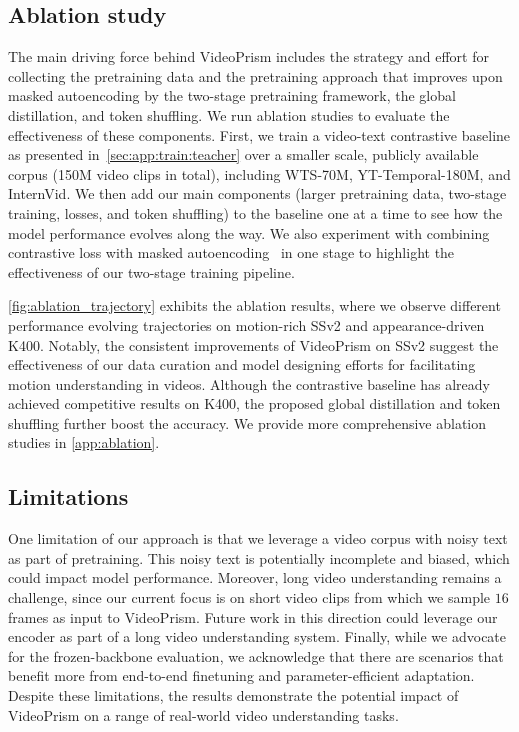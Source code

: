 \documentclass{article}
\theoremstyle{plain}
\theoremstyle{definition}
\theoremstyle{remark}
\newcommand{\OURS}{VideoPrism\xspace}
\begin{document}
\subsection{Ablation study} \label{sec:exp:ablate}
The main driving force behind \OURS includes the strategy and effort for collecting the pretraining data and the pretraining approach that improves upon masked autoencoding by the two-stage pretraining framework, the global distillation, and token shuffling. We run ablation studies to evaluate the effectiveness of these components. First, we train a video-text contrastive baseline as presented in~\cref{sec:app:train:teacher} over a smaller scale, publicly available corpus (150M video clips in total), including WTS-70M, YT-Temporal-180M, and InternVid. We then add our main components (larger pretraining data, two-stage training, losses, and token shuffling) to the baseline one at a time to see how the model performance evolves along the way. We also experiment with combining contrastive loss with masked autoencoding~\cite{feichtenhofer2022masked} in one stage to highlight the effectiveness of our two-stage training pipeline.

\cref{fig:ablation_trajectory} exhibits the ablation results, where we observe different performance evolving trajectories on motion-rich SSv2 and appearance-driven K400. Notably, the consistent improvements of \OURS on SSv2 suggest the effectiveness of our data curation and model designing efforts for facilitating motion understanding in videos. Although the contrastive baseline has already achieved competitive results on K400, the proposed global distillation and token shuffling further boost the accuracy. We provide more comprehensive ablation studies in \cref{app:ablation}.

\subsection{Limitations} 
One limitation of our approach is that we leverage a video corpus with noisy text as part of pretraining. This noisy text is potentially incomplete and biased, which could impact model performance. Moreover, long video understanding remains a challenge, since our current focus is on short video clips from which we sample $16$ frames as input to \OURS. Future work in this direction could leverage our encoder as part of a long video understanding system. Finally, while we advocate for the frozen-backbone evaluation, we acknowledge that there are scenarios that benefit more from end-to-end finetuning and parameter-efficient adaptation. Despite these limitations, the results demonstrate the potential impact of \OURS on a range of real-world video understanding tasks.
\end{document}
